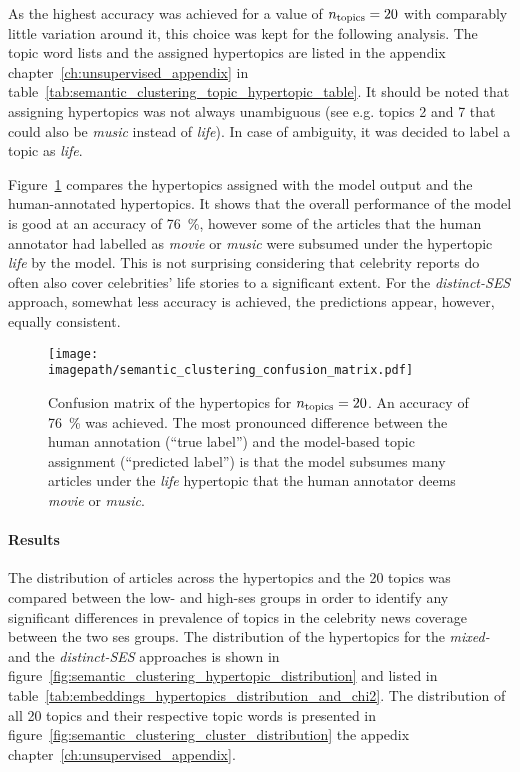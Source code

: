 As the highest accuracy was achieved for a value of $n_\text{topics}=20$ with comparably little variation around it, this choice was kept for the following analysis. The topic word lists and the assigned hypertopics are listed in the appendix chapter~\ref{ch:unsupervised_appendix} in table~\ref{tab:semantic_clustering_topic_hypertopic_table}. It should be noted that assigning hypertopics was not always unambiguous (see e.g. topics 2 and 7 that could also be \textit{music} instead of \textit{life}). In case of ambiguity, it was decided to label a topic as \textit{life}.

Figure~\ref{fig:embedding_confusion_matrix} compares the hypertopics assigned with the model output and the human-annotated hypertopics. It shows that the overall performance of the model is good at an accuracy of \SI{76}{\percent}, however some of the articles that the human annotator had labelled as \textit{movie} or \textit{music} were subsumed under the hypertopic \textit{life} by the model. This is not surprising considering that celebrity reports do often also cover celebrities' life stories to a significant extent. For the \textit{distinct-SES} approach, somewhat less accuracy is achieved, the predictions appear, however, equally consistent.

\begin{figure}
    \centering
    \texttt{[image: \\imagepath/semantic\_clustering\_confusion\_matrix.pdf]}
    \caption{Confusion matrix of the hypertopics for $n_\text{topics}=20$. An accuracy of \SI{76}{\percent} was achieved. The most pronounced difference between the human annotation (``true label'') and the model-based topic assignment (``predicted label'') is that the model subsumes many articles under the \textit{life} hypertopic that the human annotator deems \textit{movie} or \textit{music}.}\label{fig:embedding_confusion_matrix}
\end{figure}

\paragraph{Results}
The distribution of articles across the hypertopics and the \SI{20}{} topics was compared between the low- and high-\gls{ses} groups in order to identify any significant differences in prevalence of topics in the celebrity news coverage between the two \gls{ses} groups. The distribution of the hypertopics for the \textit{mixed-} and the \textit{distinct-SES} approaches is shown in figure~\ref{fig:semantic_clustering_hypertopic_distribution} and listed in table~\ref{tab:embeddings_hypertopics_distribution_and_chi2}. The distribution of all \SI{20}{} topics and their respective topic words is presented in figure~\ref{fig:semantic_clustering_cluster_distribution} the appedix chapter~\ref{ch:unsupervised_appendix}.

